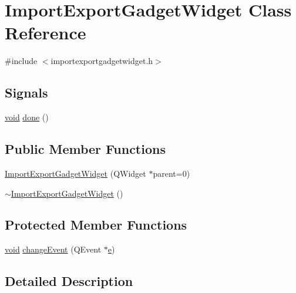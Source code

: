 \hypertarget{class_import_export_gadget_widget}{\section{\-Import\-Export\-Gadget\-Widget \-Class \-Reference}
\label{class_import_export_gadget_widget}
}


{\ttfamily \#include $<$importexportgadgetwidget.\-h$>$}

\subsection*{\-Signals}
\begin{DoxyCompactItemize}
\item 
\hyperlink{group___u_a_v_objects_plugin_ga444cf2ff3f0ecbe028adce838d373f5c}{void} \hyperlink{class_import_export_gadget_widget_a56d9e25717ccdedcbc394a2cec2c7e58}{done} ()
\end{DoxyCompactItemize}
\subsection*{\-Public \-Member \-Functions}
\begin{DoxyCompactItemize}
\item 
\hyperlink{group__importexportplugin_gaa6f8e207b497782f1c00bebfcdf362e6}{\-Import\-Export\-Gadget\-Widget} (\-Q\-Widget $\ast$parent=0)
\item 
\hyperlink{group__importexportplugin_ga96b1b166720e190f43ce5a83b0440ba8}{$\sim$\-Import\-Export\-Gadget\-Widget} ()
\end{DoxyCompactItemize}
\subsection*{\-Protected \-Member \-Functions}
\begin{DoxyCompactItemize}
\item 
\hyperlink{group___u_a_v_objects_plugin_ga444cf2ff3f0ecbe028adce838d373f5c}{void} \hyperlink{group__importexportplugin_gac24ae66f22b367d4a3854a11092b6732}{change\-Event} (\-Q\-Event $\ast$\hyperlink{_o_p_plots_8m_a9425be9aab51621e317ba7ade564b570}{e})
\end{DoxyCompactItemize}


\subsection{\-Detailed \-Description}


